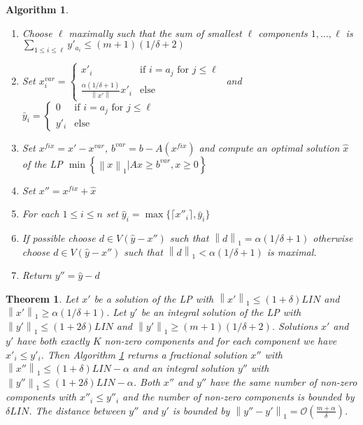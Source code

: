 \documentclass[a4paper,11pt]{article}
\newcommand{\mengest}[2]{\left\{#1|#2\right\}}
\newcommand{\nor}[1]{\left\|#1\right\|}
\newtheorem{thm}{Theorem}
\newtheorem{algo}{Algorithm}
\begin{document}
\begin{algo}\label{alg4}
\ 
  \begin{enumerate}
  \item Choose $\ell$ maximally such that the sum of smallest $\ell$ components $1, \ldots , \ell$ is 
  $\sum_{1\leq i \leq \ell} y'_{a_i} \leq (m+1)(1/ \delta +2)$
	\item Set $x^{var}_i = \begin{cases} x'_i & \text{if }i= a_j \text{ for } j \leq \ell \\
	\frac{\alpha(1 / \delta +1)}{\nor{x'}}x'_i & \text{else}
	\end{cases}$ and $\bar{y}_i = \begin{cases} 0 & \text{if }i= a_j \text{ for } j \leq \ell \\
	y'_i & \text{else}
	\end{cases}$
	\item Set $x^{fix}= x' - x^{var}$, $b^{var} = b - A(x^{fix})$ and compute an 
	optimal solution $\hat{x}$ of the LP  $\min \mengest{\nor{x}_1}{Ax \geq b^{var}, x\geq 0 }$
  \item Set $x'' = x^{fix} + \hat{x}$
  \item For each $1 \leq i \leq n$ set $\hat{y}_i = \max \{\lceil x''_i \rceil , \bar{y}_i \}$
	\item If possible choose $d \in V(\hat{y}-x'')$ such that $\nor{d}_1 = \alpha (1/ \delta +1)$ otherwise
  choose $d \in V(\hat{y}-x'')$ such that $\nor{d}_1 < \alpha (1/ \delta +1)$ is maximal.
  \item Return $y'' = \hat{y} -d$
  \end{enumerate}
\end{algo}
\begin{thm}
	Let $x'$ be a solution of the LP with $\nor{x'}_1 \leq (1+\delta) \mathit{LIN}$ and 
	$\nor{x'}_1 \geq \alpha(1/ \delta +1)$. Let $y'$ be an integral
	 solution of the LP with  $\nor{y'}_1 \leq (1+2\delta) \mathit{LIN}$ and $\nor{y'}_1 \geq (m+1)(1/ \delta +2)$.
	 Solutions $x'$ and $y'$ have both exactly $K$ non-zero components and for each component we have 
	 $x'_i \leq y'_i$.
	Then Algorithm \ref{alg4} returns a fractional solution $x''$ with $\nor{x''}_1 \leq (1+ \delta) \mathit{LIN} -\alpha$
	 and an integral solution
	$y''$ with $\nor{y''}_1 \leq (1+ 2\delta) \mathit{LIN} - \alpha$. Both $x''$ and $y''$ have the same 
	number of non-zero components with $x''_i \leq y''_i$ and the number of non-zero components is bounded by
	 $\delta \mathit{LIN}$.
	The distance between $y''$ and $y'$ is bounded by $\nor{y''-y'}_1
	= \mathcal{O}(\frac{m + \alpha}{\delta})$.
\end{thm}
\end{document}
